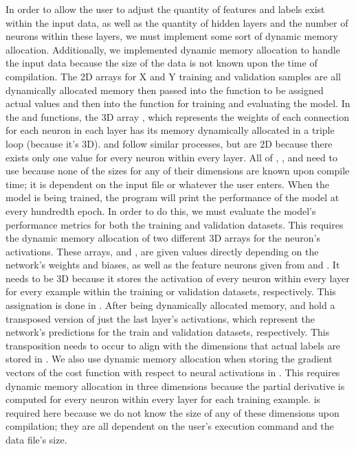 \documentclass[12pt]{article}
\begin{document}
In order to allow the user to adjust the quantity of features and labels exist within the input data, as well as the quantity of hidden layers and the number of neurons within these layers, we must implement some sort of dynamic memory allocation. Additionally, we implemented dynamic memory allocation to handle the input data because the size of the data is not known upon the time of compilation. The 2D arrays for X and Y training and validation samples are all dynamically allocated memory then passed into the  function to be assigned actual values and then into the  function for training and evaluating the model. In the  and  functions, the 3D array , which represents the weights of each connection for each neuron in each layer has its memory dynamically allocated in a triple  loop (because it’s 3D).  and  follow similar processes, but are 2D because there exists only one value for every neuron within every layer. All of , , and  need to use  because none of the sizes for any of their dimensions are known upon compile time; it is dependent on the input file  or whatever the user enters. When the model is being trained, the program will print the performance of the model at every hundredth epoch. In order to do this, we must evaluate the model’s performance metrics for both the training and validation datasets. This requires the dynamic memory allocation of two different 3D arrays for the neuron’s activations. These arrays,  and , are given values directly depending on the network’s weights and biases, as well as the feature neurons given from  and . It needs to be 3D because it stores the activation of every neuron within every layer for every example within the training or validation datasets, respectively. This assignation is done in . After being dynamically allocated memory,  and  hold a transposed version of just the last layer’s activations, which represent the network’s predictions for the train and validation datasets, respectively. This transposition needs to occur to align with the dimensions that actual labels are stored in . We also use dynamic memory allocation when storing the gradient vectors of the cost function with respect to neural activations in . This requires dynamic memory allocation in three dimensions because the partial derivative is computed for every neuron within every layer for each training example.  is required here because we do not know the size of any of these dimensions upon compilation; they are all dependent on the user’s execution command and the data file’s size.
\end{document}
